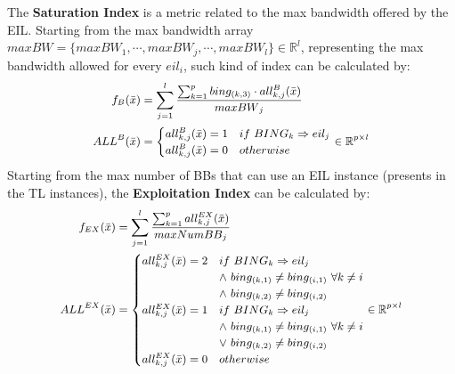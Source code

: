 %
The \textbf{Saturation Index} is a metric related to the max bandwidth offered by the EIL. Starting from the max bandwidth array $maxBW = \{ maxBW_1, \cdots, maxBW_j, \cdots, maxBW_l \} \in \mathbb{R}^{l}$, representing the max bandwidth allowed for every $eil_i$, such kind of index can be calculated by:  
%
\begin{equation} \label{eq16_PAM2}
\small
\begin{aligned} 
f_{B}(\bar x) &= \sum^l_{j=1} { \frac{\sum^p_{k=1} bing_{(k,3)} \cdot all^{B}_{k,j}(\bar x)}{{maxBW}_j} } \\
ALL^{B}(\bar x) &= \begin{cases} 
all^{B}_{k,j}(\bar x) = 1 & if \ {BING}_k \Rightarrow eil_{j} \\ 
all^{B}_{k,j}(\bar x) = 0 & otherwise
\end{cases} \in \mathbb{R}^{p \times l} \\
\end{aligned}
\end{equation}
%
%
Starting from the max number of BBs that can use an EIL instance (presents in the TL instances), the \textbf{Exploitation Index} can be calculated by:
\begin{equation} \label{eq16_bis_PAM2}
\small
\begin{aligned} 
    f_{EX}(\bar x) &= \sum^l_{j=1} { \frac{\sum^p_{k=1} all^{EX}_{k,j}(\bar x)}{{maxNumBB}_j} } \\
    ALL^{EX}(\bar x) &= \begin{cases} 
    all^{EX}_{k,j}(\bar x) = 2 & if \ {BING}_k \Rightarrow eil_{j} \\
    & \land \ bing_{(k,1)} 	\neq bing_{(i,1)} \ \forall k \neq i \\
    & \land \ bing_{(k,2)} \neq bing_{(i,2)} \\ 
    all^{EX}_{k,j}(\bar x) = 1 & if \ {BING}_k \Rightarrow eil_{j} \\
    & \land \ bing_{(k,1)} 	\neq bing_{(i,1)} \ \forall k \neq i \\
    & \lor \ bing_{(k,2)} \neq bing_{(i,2)} \\ 
    all^{EX}_{k,j}(\bar x) = 0 & otherwise
\end{cases} \in \mathbb{R}^{p \times l} \\
\end{aligned}
\end{equation}
%
